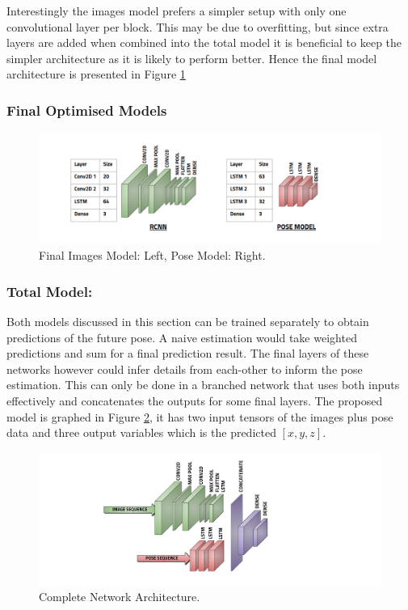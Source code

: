 \documentclass[11pt,twoside]{report}
\begin{document}
Interestingly the images model prefers a simpler setup with only one convolutional layer per block. This may be due to overfitting, but since extra layers are added when combined into the total model it is beneficial to keep the simpler architecture as it is likely to perform better. Hence the final model architecture is presented in Figure \ref{final_models}


\subsubsection{Final Optimised Models}

\noindent \begin{figure}[h!]
	\includegraphics[width = 1.0\hsize]{figures/final_models.png}
	\caption{Final Images Model: Left, Pose Model: Right.}
	\label{final_models}
\end{figure}


\subsubsection{Total Model:}
Both models discussed in this section can be trained separately to obtain predictions of the future pose. A naive estimation would take weighted predictions and sum for a final prediction result. The final layers of these networks however could infer details from each-other to inform the pose estimation. This can only be done in a branched network that uses both inputs effectively and concatenates the outputs for some final layers. The proposed model is graphed in Figure \ref{total_network_architecture}, it has two input tensors of the images plus pose data and three output variables which is the predicted $[x,y,z]$.

\noindent \begin{figure}[h!]
	\includegraphics[width = 1.0\hsize]{figures/final_model.png}
	\caption{Complete Network Architecture.}
	\label{total_network_architecture}
\end{figure}
\end{document}
